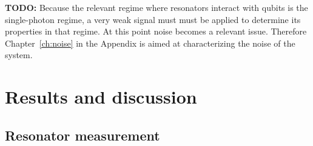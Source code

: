   \textbf{TODO:} Because the relevant regime where resonators interact with qubits is the single-photon regime, a very weak signal must must be applied to determine its properties in that regime. At this point noise becomes a relevant issue. Therefore Chapter~\ref{ch:noise} in the Appendix is aimed at characterizing the noise of the system.

\chapter{Results and discussion}
\label{ch:Results and discussion}


\section{Resonator measurement}

